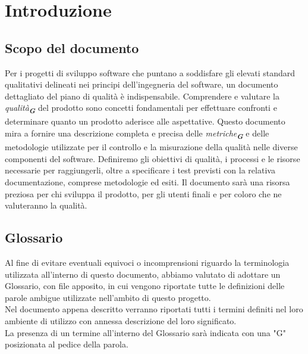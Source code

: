 



\section{Introduzione}
\label{sec:introduzione}

\subsection{Scopo del documento}
Per i progetti di sviluppo software che puntano a soddisfare gli elevati 
standard qualitativi delineati nei principi dell'ingegneria del software, 
un documento dettagliato del piano di qualità è indispensabile.
Comprendere e valutare la \emph{qualità}\textsubscript{\textit{\textbf{G}}} 
del prodotto sono concetti fondamentali 
per effettuare confronti e determinare quanto un prodotto aderisce alle aspettative.
Questo documento mira a fornire una descrizione completa e precisa delle 
\emph{metriche}\textsubscript{\textit{\textbf{G}}} e delle 
metodologie utilizzate per il controllo e la misurazione 
della qualità nelle diverse componenti del software.
Definiremo gli obiettivi di qualità, i processi e le risorse necessarie per 
raggiungerli, oltre a specificare i test previsti con la relativa documentazione, 
comprese metodologie ed esiti.
Il documento sarà una risorsa preziosa per chi sviluppa il prodotto, per gli 
utenti finali e per coloro che ne valuteranno la qualità.

\subsection{Glossario}
Al fine di evitare eventuali equivoci o incomprensioni riguardo la terminologia 
utilizzata all’interno di questo documento, 
abbiamo valutato di adottare un Glossario, con file apposito, in cui
vengono riportate tutte le definizioni delle parole ambigue utilizzate 
nell'ambito di questo progetto.\\
Nel documento appena descritto verranno riportati tutti i termini definiti nel
loro ambiente di utilizzo con annessa descrizione del loro significato.\\
La presenza di un termine all'interno del Glossario sarà indicata con una "G" 
posizionata al pedice della parola.

